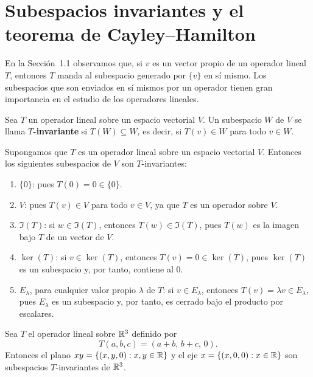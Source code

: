 \documentclass[12pt,a4paper]{book}
\begin{document}
    \section{Subespacios invariantes y el teorema de Cayley--Hamilton}

    En la Sección~1.1 observamos que, si $v$ es un vector propio de un operador lineal $T$, entonces $T$ manda al subespacio generado por $\{v\}$ en sí mismo. Los subespacios que son enviados en sí mismos por un operador tienen gran importancia en el estudio de los operadores lineales.

    \begin{definicion}
        Sea $T$ un operador lineal sobre un espacio vectorial $V$. Un subespacio $W$ de $V$ se llama \textbf{$T$-invariante} si $T(W)\subseteq W$, es decir, si $T(v)\in W$ para todo $v\in W$.
    \end{definicion}

    \begin{ejemplo}
        Supongamos que $T$ es un operador lineal sobre un espacio vectorial $V$. Entonces los siguientes subespacios de $V$ son $T$-invariantes:
        \begin{enumerate}[label=(\arabic*)]
            \item $\{0\}$: pues $T(0)=0\in\{0\}$.
            \item $V$: pues $T(v)\in V$ para todo $v\in V$, ya que $T$ es un operador sobre $V$.
            \item $\Im(T)$: si $w\in\Im(T)$, entonces $T(w)\in\Im(T)$, pues $T(w)$ es la imagen bajo $T$ de un vector de $V$.
            \item $\ker(T)$: si $v\in\ker(T)$, entonces $T(v)=0\in\ker(T)$, pues $\ker(T)$ es un subespacio y, por tanto, contiene al $0$.
            \item $E_\lambda$, para cualquier valor propio $\lambda$ de $T$: si $v\in E_\lambda$, entonces $T(v)=\lambda v\in E_\lambda$, pues $E_\lambda$ es un subespacio y, por tanto, es cerrado bajo el producto por escalares.
        \end{enumerate}
    \end{ejemplo}

    \begin{ejemplo}
        Sea $T$ el operador lineal sobre $\mathbb{R}^3$ definido por
        \begin{equation*}
            T(a,b,c)=(a+b,\,b+c,\,0).
        \end{equation*}
        Entonces el plano $xy=\{(x,y,0):x,y\in\mathbb{R}\}$ y el eje $x=\{(x,0,0):x\in\mathbb{R}\}$ son subespacios $T$-invariantes de $\mathbb{R}^3$.
    \end{ejemplo}
\end{document}
